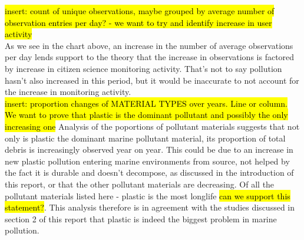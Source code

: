 \documentclass[10pt]{article}\usepackage[]{graphicx}\usepackage[]{color}
\begin{document}
\hl{insert: count of unique observations, maybe grouped by average number of observation entries per day? - we want to try and identify increase in user activity}\\
As we see in the chart above, an increase in the number of average observations per day lends support to the theory that the increase in observations is factored by increase in citizen science monitoring activity. That's not to say pollution hasn't also increased in this period, but it would be inaccurate to not account for the increase in monitoring activity.\\




\hl{insert: proportion changes of MATERIAL TYPES over years. Line or column. We want to prove that plastic is the dominant pollutant and possibly the only increasing one }
Analysis of the poportions of pollutant materials suggests that not only is plastic the dominant marine pollutant material, its proportion of total debris is increasingly observed year on year. This could be due to an increase in new plastic pollution entering marine environments from source, not helped by the fact it is durable and doesn't decompose, as discussed in the introduction of this report, or that the other pollutant materials are decreasing. Of all the pollutant materials listed here - plastic is the most longlife \hl{can we support this statement?}. This analysis therefore is in agreement with the studies discussed in section 2 of this report that plastic is indeed the biggest problem in marine pollution. 
\end{document}
